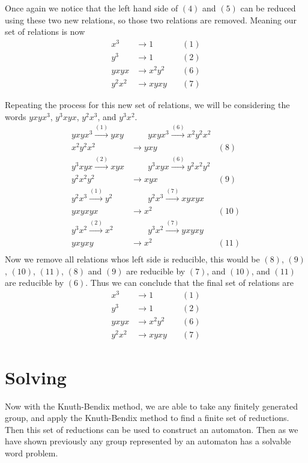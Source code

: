 \documentclass[10pt]{amsart}
\theoremstyle{definition}
\begin{document}
Once again we notice that the left hand side of $(4)$ and $(5)$ can be reduced
using these two new relations, so those two relations are removed. Meaning our
set of relations is now
\begin{align*}
  x^3&\rightarrow1\quad&(1)\\
  y^3&\rightarrow1\quad&(2)\\
  yxyx&\rightarrow x^2y^2\quad&(6)\\
  y^2x^2&\rightarrow xyxy\quad&(7)
\end{align*}

Repeating the process for this new set of relations, we will be considering the
words $yxyx^3$, $y^3xyx$, $y^2x^3$, and $y^3x^2$.
\begin{align*}
  yxyx^3\xrightarrow{(1)}yxy&\quad\quad
  yxyx^3\xrightarrow{(6)}x^2y^2x^2\\
  x^2y^2x^2&\rightarrow yxy\quad&(8)\\
  y^3xyx\xrightarrow{(2)}xyx&\quad\quad
  y^3xyx\xrightarrow{(6)}y^2x^2y^2\\
  y^2x^2y^2&\rightarrow xyx\quad&(9)\\
  y^2x^3\xrightarrow{(1)}y^2&\quad\quad
  y^2x^3\xrightarrow{(7)} xyxyx\\
  yxyxyx&\rightarrow x^2\quad&(10)\\
  y^3x^2\xrightarrow{(2)}x^2&\quad\quad
  y^3x^2\xrightarrow{(7)}yxyxy\\
  yxyxy&\rightarrow x^2\quad&(11)\\
\end{align*}
Now we remove all relations whos left side is reducible, this would be $(8)$,
$(9)$, $(10)$, $(11)$, $(8)$ and $(9)$ are reducible by $(7)$, and $(10)$, and
$(11)$ are reducible by $(6)$. Thus we can conclude that the final set of
relations are
\begin{align*}
  x^3&\rightarrow1\quad&(1)\\
  y^3&\rightarrow1\quad&(2)\\
  yxyx&\rightarrow x^2y^2\quad&(6)\\
  y^2x^2&\rightarrow xyxy\quad&(7)
\end{align*}

\section{Solving}%
\label{sec:solving}

Now with the Knuth-Bendix method, we are able to take any finitely generated
group, and apply the Knuth-Bendix method to find a finite set of reductions.
Then this set of reductions can be used to construct an automaton. Then as we
have shown previously any group represented by an automaton has a solvable word
problem.
\end{document}
